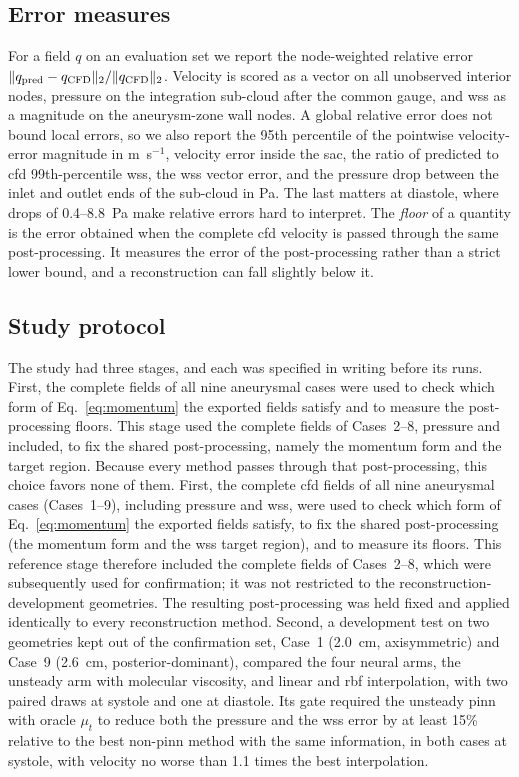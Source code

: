\documentclass[12pt,a4paper]{article}
\newcommand{\cfdrevision}[1]{#1} %
\newcommand{\CFD}{\ac{cfd}\xspace}
\newcommand{\PINN}{\ac{pinn}\xspace}
\newcommand{\WSS}{\ac{wss}\xspace}
\newcommand{\RBF}{\ac{rbf}\xspace}
\theoremstyle{definition}
\numberwithin{equation}{section}
\providecommand{\DIFaddtex}[1]{{\protect\color{blue} \sf #1}} %
\providecommand{\DIFdeltex}[1]{{\protect\color{red} \scriptsize #1}} %
\providecommand{\DIFaddbegin}{} %
\providecommand{\DIFaddend}{} %
\providecommand{\DIFdelbegin}{} %
\providecommand{\DIFdelend}{} %
\providecommand{\DIFadd}[1]{\texorpdfstring{\DIFaddtex{#1}}{#1}} %
\providecommand{\DIFdel}[1]{\texorpdfstring{\DIFdeltex{#1}}{}} %
\newcommand{\DIFscaledelfig}{0.5}
\newlength{\DIFdelgraphicswidth} %
\newlength{\DIFdelgraphicsheight} %
\newcommand{\DIFaddincludegraphics}[2][]{{\color{blue}\fbox{\DIFOincludegraphics[#1]{#2}}}} %
\newcommand{\DIFdelincludegraphics}[2][]{%
\sbox{\DIFdelgraphicsbox}{\DIFOincludegraphics[#1]{#2}}%
\settoboxwidth{\DIFdelgraphicswidth}{\DIFdelgraphicsbox} %
\settoboxtotalheight{\DIFdelgraphicsheight}{\DIFdelgraphicsbox} %
\scalebox{\DIFscaledelfig}{%
\parbox[b]{\DIFdelgraphicswidth}{\usebox{\DIFdelgraphicsbox}\\[-\baselineskip] \rule{\DIFdelgraphicswidth}{0em}}\llap{\resizebox{\DIFdelgraphicswidth}{\DIFdelgraphicsheight}{%
\setlength{\unitlength}{\DIFdelgraphicswidth}%
\begin{picture}(1,1)%
\thicklines\linethickness{2pt} %
{\color[rgb]{1,0,0}\put(0,0){\framebox(1,1){}}}%
{\color[rgb]{1,0,0}\put(0,0){\line( 1,1){1}}}%
{\color[rgb]{1,0,0}\put(0,1){\line(1,-1){1}}}%
\end{picture}%
}\hspace*{3pt}}} %
} %
\DeclareRobustCommand{\DIFaddbegin}{\DIFOaddbegin \let\includegraphics\DIFaddincludegraphics} %
\DeclareRobustCommand{\DIFaddend}{\DIFOaddend \let\includegraphics\DIFOincludegraphics} %
\DeclareRobustCommand{\DIFdelbegin}{\DIFOdelbegin \let\includegraphics\DIFdelincludegraphics} %
\DeclareRobustCommand{\DIFdelend}{\DIFOaddend \let\includegraphics\DIFOincludegraphics} %
\begin{document}
\subsection{Error measures}
\label{sec:metrics}
For a field $q$ on an evaluation set we report the node-weighted relative error $\|q_{\rm pred}-q_{\rm CFD}\|_2/\|q_{\rm CFD}\|_2$. Velocity is scored as a vector on all unobserved interior nodes, pressure on the integration sub-cloud after the common gauge, and \WSS as a magnitude on the aneurysm-zone wall nodes. A global relative error does not bound local errors, so we also report the 95th percentile of the pointwise velocity-error magnitude in m~s$^{-1}$, velocity error inside the sac, the ratio of predicted to \CFD 99th-percentile \WSS, the \WSS vector error, and the pressure drop between the inlet and outlet ends of the sub-cloud in Pa. The last matters at diastole, where drops of 0.4--8.8~Pa make relative errors hard to interpret. The \emph{floor} of a quantity is the error obtained when the complete \CFD velocity is passed through the same post-processing. It measures the error of the post-processing rather than a strict lower bound, and a reconstruction can fall slightly below it.

\subsection{Study protocol}
\label{sec:protocol}
The study had three stages, and each was specified in writing before its runs. \DIFdelbegin \DIFdel{First, the complete }%
\DIFdel{fields of all nine aneurysmal cases were used to check which form of Eq.~\eqref{eq:momentum} the exported fields satisfy and to measure the post-processing floors. This stage used the complete fields of Cases~2--8, pressure and }%
\DIFdel{included, to fix the shared post-processing, namely the momentum form and the }%
\DIFdel{target region. Because every method passes through that post-processing, this choice favors none of them. }\DIFdelend \DIFaddbegin \DIFadd{\cfdrevision{First, the complete \CFD fields of all nine aneurysmal cases (Cases~1--9), including pressure and \WSS, were used to check which form of Eq.~\eqref{eq:momentum} the exported fields satisfy, to fix the shared post-processing (the momentum form and the \WSS target region), and to measure its floors. This reference stage therefore included the complete fields of Cases~2--8, which were subsequently used for confirmation; it was not restricted to the reconstruction-development geometries. The resulting post-processing was held fixed and applied identically to every reconstruction method.} }\DIFaddend Second, a development test on two geometries kept out of the confirmation set, Case~1 (2.0~cm, axisymmetric) and Case~9 (2.6~cm, posterior-dominant), compared the four neural arms, the unsteady arm with molecular viscosity, and linear and \RBF interpolation, with two paired draws at systole and one at diastole. Its gate required the unsteady \PINN with oracle $\mu_t$ to reduce both the pressure and the \WSS error by at least 15\% relative to the best non-\PINN method with the same information, in both cases at systole, with velocity no worse than 1.1 times the best interpolation.
\end{document}
